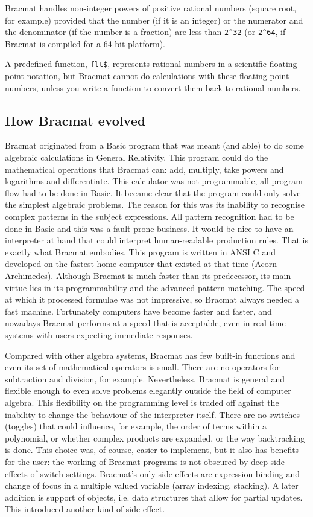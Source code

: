 \documentclass[12pt]{article}
\begin{document}
Bracmat handles non-integer powers of positive rational numbers
(square root, for example) provided that the number (if it is an
integer) or the numerator and the denominator (if the number is a
fraction) are less than \verb|2^32| (or \verb|2^64|, if Bracmat is compiled
for a 64-bit platform).

A predefined function, \verb|flt$|, represents rational
numbers in a scientific floating point notation, but Bracmat cannot do
calculations with these floating point numbers, unless you write a
function to convert them back to rational numbers.

\subsection{How Bracmat evolved}

Bracmat originated from a Basic program that was meant (and able) to
do some algebraic calculations in General Relativity. This program
could do the mathematical operations that Bracmat can: add, multiply,
take powers and logarithms and differentiate. This calculator was not
programmable, all program flow had to be done in Basic. It became
clear that the program could only solve the simplest algebraic
problems. The reason for this was its inability to recognise complex
patterns in the subject expressions. All pattern recognition had to be
done in Basic and this was a fault prone business. It would be
nice to have an interpreter at hand that could interpret human-readable 
production rules. That is exactly what Bracmat embodies. This
program is written in ANSI C and developed on the fastest home
computer that existed at that time (Acorn Archimedes). Although
Bracmat is much faster than its predecessor, its main virtue lies in
its programmability and the advanced pattern matching. The speed at
which it processed formulae was not impressive, so Bracmat always
needed a fast machine. Fortunately computers have become faster and
faster, and nowadays Bracmat performs at a speed that is 
acceptable, even in real time systems with users expecting immediate
responses.

Compared with other algebra systems, Bracmat has few built-in
functions and even its set of mathematical operators is small. There
are no operators for subtraction and division, for
example. Nevertheless, Bracmat is general and flexible enough to even solve
problems elegantly outside the field of computer algebra.
This flexibility on the programming level is traded off against
the inability to change the behaviour of the interpreter itself. There
are no switches (toggles) that could influence, for example, the order
of terms within a polynomial, or whether complex products are
expanded, or the way backtracking is done. This choice was, of course,
easier to implement, but it also has benefits for the user: the
working of Bracmat programs is not obscured by deep side effects of
switch settings. Bracmat's only side effects are
expression binding and change of focus in a multiple valued variable
(array indexing, stacking). A later addition is support of objects,
i.e. data structures that allow for partial updates. This introduced
another kind of side effect.
\end{document}

